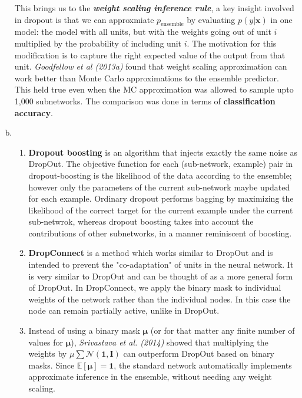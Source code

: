 \documentclass[fleqn]{article}
\begin{document}
\begin{enumerate}[a)]
	This brings us to the \textbf{\textit{weight scaling inference rule}}, a key insight involved in dropout is that we can approxmiate $p_{\text{ensemble}}$ by evaluating $p(y|\bm{x})$ in one model: the model with all units, but with the weights going out of unit $i$ multiplied by the probability of including unit $i$. The motivation for this modification is to capture the right expected value of the output from that unit.\hfill \break
	\textit{Goodfellow et al (2013a)} found that weight scaling approximation can work better than Monte Carlo approximations to the ensemble predictor. This held true even when the MC approximation was allowed to sample upto 1,000 subnetworks. The comparison was done in terms of \textbf{classification accuracy}.
	\item
	\begin{enumerate}
		\item
		\textbf{Dropout boosting}  is an algorithm that injects exactly the same noise as DropOut. The objective function for each (sub-network, example) pair in dropout-boosting is the likelihood of the data according to the ensemble; however only the parameters of the current sub-network maybe updated for each example. Ordinary dropout performs bagging by maximizing the likelihood of the correct target for the current example under the current sub-netwrok, whereas dropout boosting takes into account the contributions of other subnetworks, in a manner reminiscent of boosting. 
		\item
		\textbf{DropConnect} is a method which works similar to DropOut and is intended to prevent the "co-adaptation" of units in the neural network. It is very similar to DropOut and can be thought of as a more general form of DropOut. In DropConnect, we apply the binary mask to individual weights of the network rather than the individual nodes. In this case the node can remain partially active, unlike in DropOut.
		\vspace{40mm}
		
		\item 
		Instead of using a binary mask $\bm{\mu}$ (or for that matter any finite number of values for $\bm{\mu}$), \textit{Srivastava et al. (2014)} showed that multiplying the weights by $\mu \sum \mathcal{N}(\bm{1, I})$ can outperform DropOut based on binary masks. Since $\mathbb{E}[\bm{\mu}] = \bm{1}$, the standard network automatically implements approximate inference in the ensemble, without needing any weight scaling.
		
	\end{enumerate}
\end{enumerate}
\end{document}
